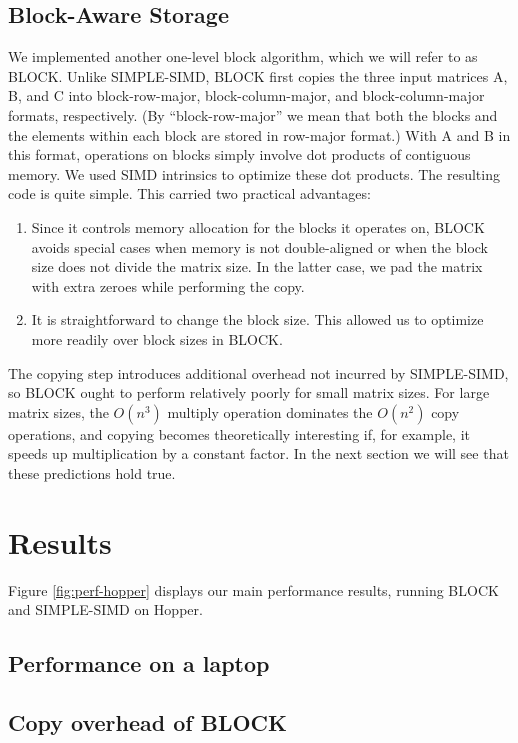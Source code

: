 \documentclass{article}
\begin{document}
\subsection{Block-Aware Storage}
We implemented another one-level block algorithm, which we will refer to as BLOCK. Unlike SIMPLE-SIMD, BLOCK first copies the three input matrices A, B, and C into block-row-major, block-column-major, and block-column-major formats, respectively.  (By ``block-row-major'' we mean that both the blocks and the elements within each block are stored in row-major format.)  With A and B in this format, operations on blocks simply involve dot products of contiguous memory.  We used SIMD intrinsics to optimize these dot products.  The resulting code is quite simple.  This carried two practical advantages:
\begin{enumerate}
  \item Since it controls memory allocation for the blocks it operates on, BLOCK avoids special cases when memory is not double-aligned or when the block size does not divide the matrix size.  In the latter case, we pad the matrix with extra zeroes while performing the copy.
  \item It is straightforward to change the block size.  This allowed us to optimize more readily over block sizes in BLOCK.
\end{enumerate}

The copying step introduces additional overhead not incurred by SIMPLE-SIMD, so BLOCK ought to perform relatively poorly for small matrix sizes.  For large matrix sizes, the $O(n^3)$ multiply operation dominates the $O(n^2)$ copy operations, and copying becomes theoretically interesting if, for example, it speeds up multiplication by a constant factor.  In the next section we will see that these predictions hold true.

\section{Results}
\label{sec:results}
Figure \ref{fig:perf-hopper} displays our main performance results, running BLOCK and SIMPLE-SIMD on Hopper.  



\subsection{Performance on a laptop}

\subsection{Copy overhead of BLOCK}
\end{document}
